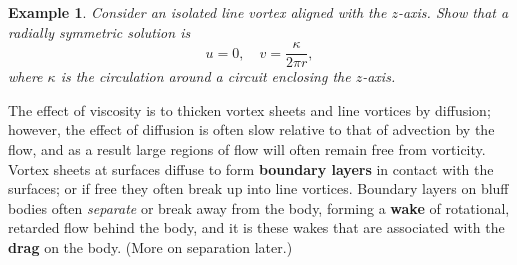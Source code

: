 \documentclass[twoside,a4paper,11pt]{report}
\newtheorem{exmp}{Example}}
\begin{document}
\begin{exmp}
Consider an isolated line vortex aligned with the $z$-axis. Show that a
radially symmetric solution is
\[ u=0, \quad v = \frac{\kappa }{2\pi r}, \]
where $\kappa$ is the circulation around a circuit enclosing the $z$-axis. 
\end{exmp}





The effect of viscosity is to thicken vortex sheets and line vortices by 
diffusion; however, the effect of diffusion is often slow relative to that 
of advection by the flow, and as a result large regions of flow will often 
remain free from vorticity. Vortex sheets at surfaces diffuse to form 
\textbf{boundary layers} in contact with the surfaces; or if free they often 
break up into line vortices. Boundary layers on bluff bodies often 
\textit{separate} or break away from the body, forming a \textbf{wake} of rotational, 
retarded flow behind the body, and it is these wakes that are associated 
with the \textbf{drag} on the body. (More on separation later.)
\end{document}
